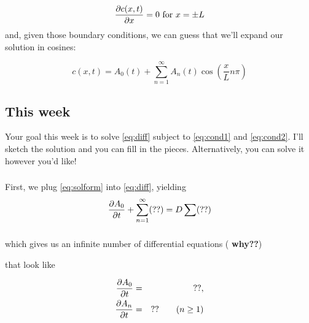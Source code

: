\documentclass[12pt]{article}
\begin{document}
\begin{equation}
\label{eq:cond2}
  \frac{\partial c(x,t)}{\partial x} = 0 \text{ for }x=\pm L
\end{equation}
and, given those boundary conditions, we can guess that we'll expand
our solution in cosines:


\begin{equation}
  \label{eq:solform}
  c(x,t) = A_0(t) + \sum_{n=1}^\infty A_n(t)\cos\left(\frac{x}{L}n\pi\right)
\end{equation}

\subsection{This week}
Your goal this week is to solve \eqref{eq:diff} subject to
\eqref{eq:cond1} and \eqref{eq:cond2}. I'll sketch the solution and
you can fill in the pieces. Alternatively, you can solve it however
you'd like!



\subsubsection{}
First, we plug \eqref{eq:solform} into \eqref{eq:diff}, yielding
\begin{equation}
  \frac{\partial A_0}{\partial t} + \sum_{n=1}^{\infty}(??) = D\sum(??)
\end{equation}

\subsubsection{}
which gives us an infinite number of differential equations ({\bf
  why??}) 


that look like


\begin{eqnarray}
  \frac{\partial A_0}{\partial t} &=& ??,\\
  \frac{\partial A_n}{\partial t} &=& ??\qquad (n\ge 1)
\end{eqnarray}

\end{document}
